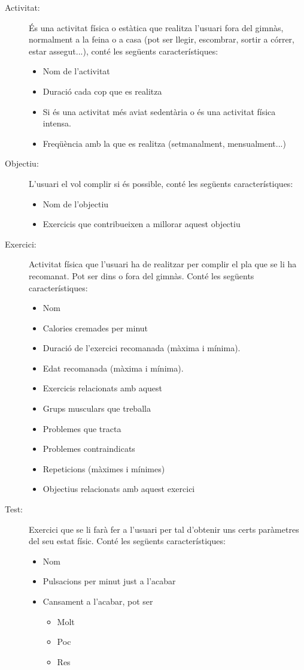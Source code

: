 \documentclass[a4paper, 12pt, UTF8]{article}
\begin{document}
\begin{description}
	\item[Activitat:] És una activitat física o estàtica que realitza l'usuari fora del gimnàs, normalment a la feina o a casa (pot ser llegir, escombrar, sortir a córrer, estar assegut...), conté les següents característiques:
	
	\begin{itemize}
		\item Nom de l'activitat
		\item Duració cada cop que es realitza
		\item Si és una activitat més aviat sedentària o és una activitat física intensa.  
		\item Freqüència amb la que es realitza (setmanalment, mensualment...)
	\end{itemize}
	
	\item[Objectiu:] L'usuari el vol complir si és possible, conté les següents característiques:
	\begin{itemize}
		\item Nom de l'objectiu
		\item Exercicis que contribueixen a millorar aquest objectiu
	\end{itemize}
	
	\item[Exercici:] Activitat física que l'usuari ha de realitzar per complir el pla que se li ha recomanat. Pot ser dins o fora del gimnàs. Conté les següents característiques:
	\begin{itemize}
		\item Nom
		\item Calories cremades per minut
		\item Duració de l'exercici recomanada (màxima i mínima).
		\item Edat recomanada (màxima i mínima).
		\item Exercicis relacionats amb aquest
		\item Grups musculars que treballa
		\item Problemes que tracta
		\item Problemes contraindicats
		\item Repeticions (màximes i mínimes)
		\item Objectius relacionats amb aquest exercici
	\end{itemize}
	
	\item[Test:] Exercici que se li farà fer a l'usuari per tal d'obtenir uns certs paràmetres del seu estat físic. Conté les següents característiques:
	\begin{itemize}
		\item Nom
		\item Pulsacions per minut just a l'acabar
		\item Cansament a l'acabar, pot ser
		\begin{itemize}
			\item Molt
			\item Poc
			\item Res
		\end{itemize}			
	\end{itemize}
	

\end{description}
\end{document}
